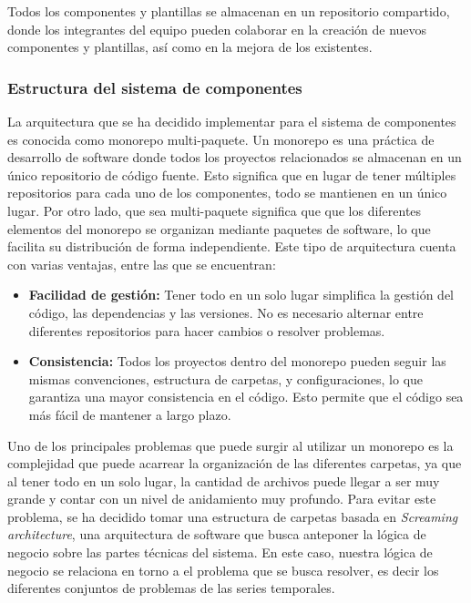 Todos los componentes y plantillas se almacenan en un repositorio
compartido, donde los integrantes del equipo pueden colaborar en la
creación de nuevos componentes y plantillas, así como en la mejora de
los existentes.

\subsubsection{Estructura del sistema de componentes}
La arquitectura que se ha decidido implementar para el sistema de componentes
es conocida como monorepo multi-paquete. Un monorepo es una práctica de 
desarrollo de software donde todos los proyectos relacionados 
se almacenan en un único repositorio de código fuente. Esto significa que en 
lugar de tener múltiples repositorios para cada uno de los componentes, todo se 
mantienen en un único lugar. Por otro lado, que sea multi-paquete significa que
que los diferentes elementos del monorepo se organizan mediante paquetes de
software, lo que facilita su distribución de forma independiente. Este tipo de 
arquitectura cuenta con varias ventajas, entre las que se encuentran:

\begin{itemize}
    \item \textbf{Facilidad de gestión:} Tener todo en un solo lugar simplifica la gestión 
    del código, las dependencias y las versiones. No es necesario alternar entre
    diferentes repositorios para hacer cambios o resolver problemas.
    \item \textbf{Consistencia:} Todos los proyectos dentro del monorepo pueden seguir 
    las mismas convenciones, estructura de carpetas, y configuraciones, 
    lo que garantiza una mayor consistencia en el código. Esto permite que el código
    sea más fácil de mantener a largo plazo.
\end{itemize}

Uno de los principales problemas que puede surgir al utilizar un monorepo es la
complejidad que puede acarrear la organización de las diferentes carpetas, ya
que al tener todo en un solo lugar, la cantidad de archivos puede llegar
a ser muy grande y contar con un nivel de anidamiento muy profundo. Para evitar este
problema, se ha decidido tomar una estructura de carpetas basada en 
\textit{Screaming architecture}, una arquitectura de software que busca anteponer la
lógica de negocio sobre las partes técnicas del sistema. En este caso, nuestra lógica de
negocio se relaciona en torno a el problema que se busca resolver, es decir los diferentes 
conjuntos de problemas de las series temporales.\medskip

